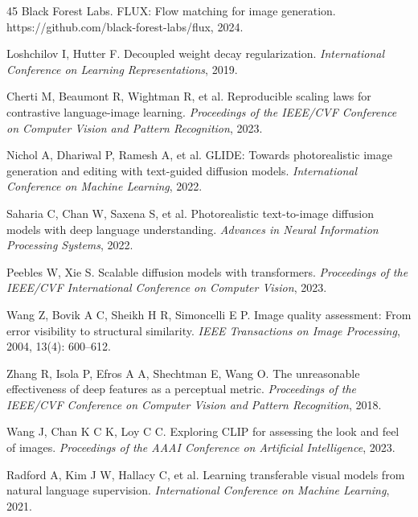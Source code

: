 \documentclass[times,twocolumn,final]{elsarticle}
\begin{document}
\begin{thebibliography}{45}
Black Forest Labs. FLUX: Flow matching for image generation. https://github.com/black-forest-labs/flux, 2024.

Loshchilov I, Hutter F. Decoupled weight decay regularization. \textit{International Conference on Learning Representations}, 2019.

Cherti M, Beaumont R, Wightman R, et al. Reproducible scaling laws for contrastive language-image learning. \textit{Proceedings of the IEEE/CVF Conference on Computer Vision and Pattern Recognition}, 2023.

Nichol A, Dhariwal P, Ramesh A, et al. GLIDE: Towards photorealistic image generation and editing with text-guided diffusion models. \textit{International Conference on Machine Learning}, 2022.

Saharia C, Chan W, Saxena S, et al. Photorealistic text-to-image diffusion models with deep language understanding. \textit{Advances in Neural Information Processing Systems}, 2022.

Peebles W, Xie S. Scalable diffusion models with transformers. \textit{Proceedings of the IEEE/CVF International Conference on Computer Vision}, 2023.

Wang Z, Bovik A C, Sheikh H R, Simoncelli E P. Image quality assessment: From error visibility to structural similarity. \textit{IEEE Transactions on Image Processing}, 2004, 13(4): 600--612.

Zhang R, Isola P, Efros A A, Shechtman E, Wang O. The unreasonable effectiveness of deep features as a perceptual metric. \textit{Proceedings of the IEEE/CVF Conference on Computer Vision and Pattern Recognition}, 2018.

Wang J, Chan K C K, Loy C C. Exploring CLIP for assessing the look and feel of images. \textit{Proceedings of the AAAI Conference on Artificial Intelligence}, 2023.

Radford A, Kim J W, Hallacy C, et al. Learning transferable visual models from natural language supervision. \textit{International Conference on Machine Learning}, 2021.

\end{thebibliography}
\end{document}
